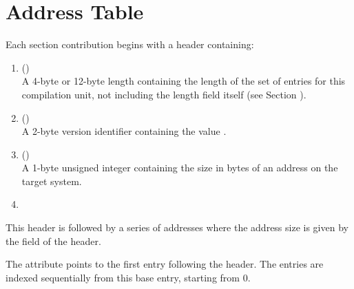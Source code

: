 \section{Address Table}
\label{chap:addresstable}
Each 
\bb
\dotdebugaddr{} section contribution
\eb
begins with a header containing:
\begin{enumerate}[1. ]
\item \HFNunitlength{} () \\
A 4-byte or 12-byte length containing the length of
the set of entries for this compilation unit, not
including the length field itself
\bb
(see Section ).
\eb

\item  \HFNversion{} (\HFTuhalf) \\
A 2-byte version identifier containing the value
\versiondotdebugaddr{}.

\item	\HFNaddresssize{} (\HFTubyte) \\
A 1-byte unsigned integer containing the size in
bytes of an address
\db
on the target system.

\item	\HFNreservedwassegmentselectorsize{} 
\db
\\

\end{enumerate}

This header is followed by a series of 
\bb
addresses where
\eb
the address size is given by the \HFNaddresssize{}
field of the header. 
\db

The \DWATaddrbase{} attribute points to the first entry
following the header. The entries are indexed sequentially
from this base entry, starting from 0.


